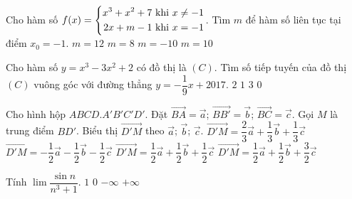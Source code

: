 \begin{ex}%
	Cho hàm số $f(x)=\left\{\begin{aligned}x^3+x^2+7 \,\, \text{khi} \,\, x\neq -1&\\2x+m-1\,\, \text{khi} \,\, x=-1\end{aligned}\right.$. Tìm $m$ để hàm số liên tục tại điểm $x_0=-1$.
	\choice
	{$m=12$}
	{$m=8$}
	{$m=-10$}
	{\True $m=10$}
\end{ex}
\begin{ex}%
	Cho hàm số $y=x^3-3x^2+2$ có đồ thị là $(C)$. Tìm số tiếp tuyến của đồ thị $(C)$ vuông góc với đường thẳng $y=-\dfrac{1}{9}x+2017$.
	\choice
	{\True $2$}
	{$1$}
	{$3$}
	{$0$}
\end{ex}
\begin{ex}%
	Cho hình hộp $ABCD.A'B'C'D'$. Đặt $\vec{BA}=\vec{a}$; $\vec{BB'}=\vec{b}$; $\vec{BC}=\vec{c}$. Gọi $M$ là trung điểm $BD'$. Biểu thị $\vec{D'M}$ theo $\vec{a}$; $\vec{b}$; $\vec{c}$.
	\choice
	{$\vec{D'M}=\dfrac{2}{3}\vec{a}+\dfrac{1}{3}\vec{b}+\dfrac{1}{3}\vec{c}$}
	{\True $\vec{D'M}=-\dfrac{1}{2}\vec{a}-\dfrac{1}{2}\vec{b}-\dfrac{1}{2}\vec{c}$}
	{$\vec{D'M}=\dfrac{1}{2}\vec{a}+\dfrac{1}{2}\vec{b}+\dfrac{1}{2}\vec{c}$}
	{$\vec{D'M}=\dfrac{1}{2}\vec{a}+\dfrac{1}{2}\vec{b}+\dfrac{3}{2}\vec{c}$}
\end{ex}
\begin{ex}%
	Tính $\lim \dfrac{\sin n}{n^3+1}$.
	\choice
	{$1$}
	{\True $0$}
	{$-\infty$}
	{$+\infty$}
\end{ex}
